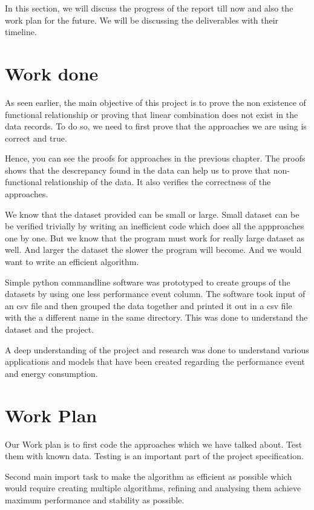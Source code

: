 In this section, we will discuss the progress of the report till now and also the work plan for the future. We will be discussing the deliverables with their timeline.

\section{Work done}
As seen earlier, the main objective of this project is to prove the non existence of functional relationship or proving that linear combination does not exist in the data records. To do so, we need to first prove that the approaches we are using is correct and true.

Hence, you can see the proofs for approaches in the previous chapter. The proofs shows that the descrepancy found in the data can help us to prove that non-functional relationship of the data. It also verifies the correctness of the approaches.

We know that the dataset provided can be small or large. Small dataset can be be verified trivially by writing an inefficient code which does all the appproaches one by one. But we know that the program must work for really large dataset as well. And larger the dataset the slower the program will become. And we would want to write an efficient algorithm.

Simple python commandline software was prototyped to create groups of the datasets by using one less performance event column. The software took input of an csv file and then grouped the data together and printed it out in a csv file with the a different name in the same directory. This was done to understand the dataset and the project.

A deep understanding of the project and research was done to understand various applications and models that have been created regarding the performance event and energy consumption.

\section{Work Plan}

Our Work plan is to first code the approaches which we have talked about. Test them with known data. Testing is an important part of the project specification.

Second main import task to make the algorithm as efficient as possible which would require creating multiple algorithms, refining and analysing them achieve maximum performance and stability as possible.

